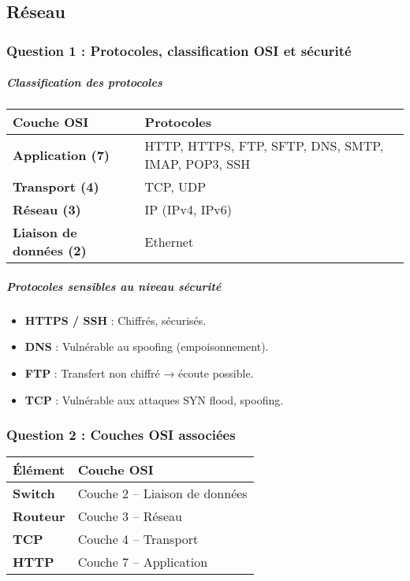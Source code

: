 \documentclass[12pt,a4paper]{article}
\begin{document}
\vspace{0.5cm}

\subsection{Réseau}

\subsubsection{Question 1 : Protocoles, classification OSI et sécurité}

\subparagraph*{Classification des protocoles}

\begin{tabular}{>{\bfseries}l l}
\toprule
Couche OSI & Protocoles \\
\midrule
Application (7) & HTTP, HTTPS, FTP, SFTP, DNS, SMTP, IMAP, POP3, SSH \\
Transport (4) & TCP, UDP \\
Réseau (3) & IP (IPv4, IPv6) \\
Liaison de données (2) & Ethernet \\
\bottomrule
\end{tabular}

\vspace{0.5cm}

\subparagraph*{Protocoles sensibles au niveau sécurité}

\begin{itemize}
    \item \textbf{HTTPS / SSH} : Chiffrés, sécurisés.
    \item \textbf{DNS} : Vulnérable au spoofing (empoisonnement).
    \item \textbf{FTP} : Transfert non chiffré → écoute possible.
    \item \textbf{TCP} : Vulnérable aux attaques SYN flood, spoofing.
\end{itemize}

\subsubsection{Question 2 : Couches OSI associées}

\begin{tabular}{>{\bfseries}l l}
\toprule
Élément & Couche OSI \\
\midrule
Switch & Couche 2 – Liaison de données \\
Routeur & Couche 3 – Réseau \\
TCP & Couche 4 – Transport \\
HTTP & Couche 7 – Application \\
\bottomrule
\end{tabular}
\end{document}
